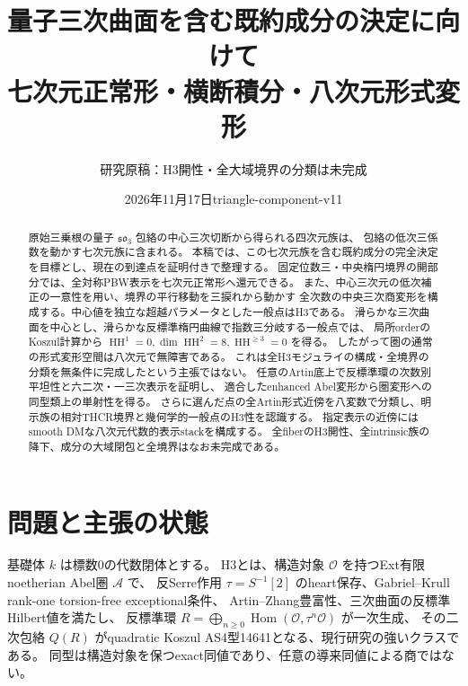 \documentclass[11pt,a4paper]{ltjsarticle}
\title{量子三次曲面を含む既約成分の決定に向けて\\\large 七次元正常形・横断積分・八次元形式変形}
\author{研究原稿：H3開性・全大域境界の分類は未完成}
\date{2026年11月17日\quad triangle-component-v11}
\theoremstyle{definition}\newtheorem{definition}[theorem]{定義}
\theoremstyle{remark}\newtheorem{remark}[theorem]{注意}
\newcommand{\HH}{\operatorname{HH}}
\newcommand{\Hom}{\operatorname{Hom}}
\newcommand{\OO}{\mathcal O}
\begin{document}
\maketitle
\begin{abstract}
原始三乗根の量子 $\mathfrak{so}_3$ 包絡の中心三次切断から得られる四次元族は、
包絡の低次三係数を動かす七次元族に含まれる。
本稿では、この七次元族を含む既約成分の完全決定を目標とし、現在の到達点を証明付きで整理する。
固定位数三・中央楕円境界の開部分では、全対称PBW表示を七次元正常形へ還元できる。
また、中心三次元の低次補正の一意性を用い、境界の平行移動を三捩れから動かす
全次数の中央三次商変形を構成する。中心値を独立な超越パラメータとした一般点はH3である。
滑らかな三次曲面を中心とし、滑らかな反標準楕円曲線で指数三分岐する一般点では、
局所orderのKoszul計算から $\HH^1=0,\dim\HH^2=8,\HH^{\ge3}=0$ を得る。
したがって圏の通常の形式変形空間は八次元で無障害である。
これは全H3モジュライの構成・全境界の分類を無条件に完成したという主張ではない。
任意のArtin底上で反標準環の次数別平坦性と六二次・一三次表示を証明し、
適合したenhanced Abel変形から圏変形への同型類上の単射性を得る。
さらに選んだ点の全Artin形式近傍を八変数で分類し、明示族の相対THCR境界と幾何学的一般点のH3性を認識する。
指定表示の近傍にはsmooth DMな八次元代数的表示stackを構成する。
全fiberのH3開性、全intrinsic族の降下、成分の大域閉包と全境界はなお未完成である。
\end{abstract}
\tableofcontents

\section{問題と主張の状態}
基礎体 $k$ は標数0の代数閉体とする。
H3とは、構造対象 $\OO$ を持つExt有限noetherian Abel圏 $\mathcal A$ で、
反Serre作用 $\tau=S^{-1}[2]$ のheart保存、Gabriel--Krull rank-one torsion-free exceptional条件、
Artin--Zhang豊富性、三次曲面の反標準Hilbert値を満たし、
反標準環 $R=\bigoplus_{n\ge0}\Hom(\OO,\tau^n\OO)$ が一次生成、
その二次包絡 $Q(R)$ がquadratic Koszul AS4型14641となる、現行研究の強いクラスである。
同型は構造対象を保つexact同値であり、任意の導来同値による商ではない。
\end{document}
